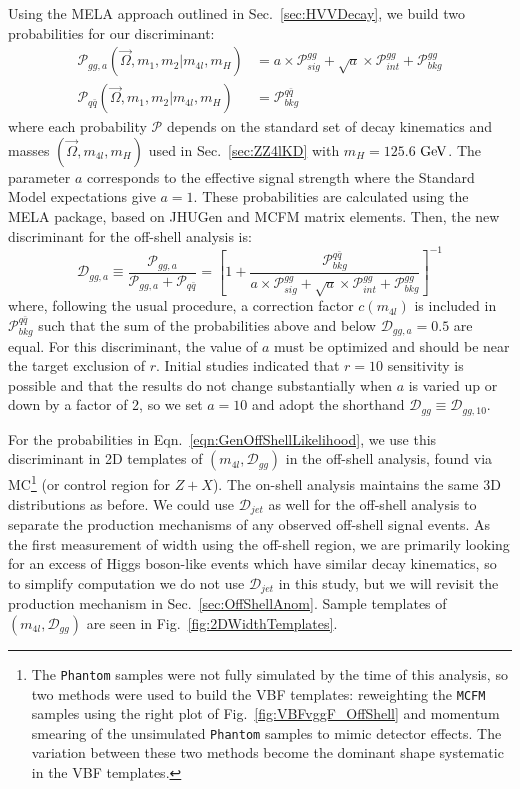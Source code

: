 Using the MELA approach outlined in Sec.~\ref{sec:HVVDecay}, we build two probabilities for our discriminant:
\begin{align}
\mathcal{P}_{gg,a}(\vec{\Omega},m_1,m_2|m_{4l},m_{H}) &= a\times\mathcal{P}_{sig}^{gg} + \sqrt{a}\times\mathcal{P}_{int}^{gg} + \mathcal{P}_{bkg}^{gg} \\
\mathcal{P}_{q\bar{q}}(\vec{\Omega},m_1,m_2|m_{4l},m_{H}) &= \mathcal{P}_{bkg}^{q\bar{q}}
\end{align}
where each probability $\mathcal{P}$ depends on the standard set of decay kinematics and masses $(\vec{\Omega},m_{4l},m_H)$ used in Sec.~\ref{sec:ZZ4lKD} with $m_H=125.6$ $\rm{GeV}$. The parameter $a$ corresponds to the effective signal strength where the Standard Model expectations give $a=1$. These probabilities are calculated using the MELA package, based on JHUGen and MCFM matrix elements. Then, the new discriminant for the off-shell analysis is:
\begin{equation}
\mathcal{D}_{gg,a} \equiv \frac{\mathcal{P}_{gg,a}}{\mathcal{P}_{gg,a}+\mathcal{P}_{q\bar{q}}} = \left[1 + \frac{\mathcal{P}_{bkg}^{q\bar{q}}}{a\times\mathcal{P}_{sig}^{gg} + \sqrt{a}\times\mathcal{P}_{int}^{gg} + \mathcal{P}_{bkg}^{gg}}\right]^{-1}
\end{equation}
where, following the usual procedure, a correction factor $c(m_{4l})$ is included in $\mathcal{P}_{bkg}^{q\bar{q}}$ such that the sum of the probabilities above and below $\mathcal{D}_{gg,a}=0.5$ are equal. For this discriminant, the value of $a$ must be optimized and should be near the target exclusion of $r$. Initial studies indicated that $r=10$ sensitivity is possible and that the results do not change substantially when $a$ is varied up or down by a factor of 2, so we set $a=10$ and adopt the shorthand $\mathcal{D}_{gg} \equiv \mathcal{D}_{gg,10}$.

For the probabilities in Eqn.~\ref{eqn:GenOffShellLikelihood}, we use this discriminant in 2D templates of $(m_{4l},\mathcal{D}_{gg})$ in the off-shell analysis, found via MC\footnote{The {\tt Phantom} samples were not fully simulated by the time of this analysis, so two methods were used to build the VBF templates: reweighting the {\tt MCFM} samples using the right plot of Fig.~\ref{fig:VBFvggF_OffShell} and momentum smearing of the unsimulated {\tt Phantom} samples to mimic detector effects. The variation between these two methods become the dominant shape systematic in the VBF templates.} (or control region for $Z+X$). The on-shell analysis maintains the same 3D distributions as before. We could use $\mathcal{D}_{jet}$ as well for the off-shell analysis to separate the production mechanisms of any observed off-shell signal events. As the first measurement of width using the off-shell region, we are primarily looking for an excess of Higgs boson-like events which have similar decay kinematics, so to simplify computation we do not use $\mathcal{D}_{jet}$ in this study, but we will revisit the production mechanism in Sec.~\ref{sec:OffShellAnom}. Sample templates of $(m_{4l},\mathcal{D}_{gg})$ are seen in Fig.~\ref{fig:2DWidthTemplates}.

